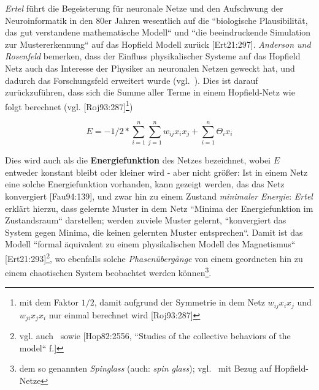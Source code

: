 \textit{Ertel} führt die Begeisterung für neuronale Netze und den Aufschwung der Neuroinformatik in den 80er Jahren wesentlich auf die ``biologische Plausibilität, das gut verstandene mathematische Modell`` und ``die beeindruckende Simulation zur Mustererkennung`` auf das Hopfield Modell zurück [Ert21:297]. \textit{Anderson und Rosenfeld} bemerken, dass der Einfluss physikalischer Systeme auf das Hopfield Netz auch das Interesse der Physiker an neuronalen Netzen geweckt hat, und dadurch das Forschungsfeld erweitert wurde (vgl.~\cite[458]{AR88}). Dies ist darauf zurückzuführen, dass sich die Summe aller Terme in einem Hopfield-Netz wie folgt berechnet (vgl. [Roj93:287]\footnote{
    mit dem Faktor $1/2$, damit aufgrund der Symmetrie in dem Netz $w_{ij}x_ix_j$ und $w_{ji}x_jx_i$ nur einmal berechnet wird [Roj93:287]
})

\begin{equation}
E = -1/2 * \sum^n_{i=1}\sum^n_{j=1} w_{ij}x_ix_j + \sum^n_{i=1}\Theta_ix_i
\label{eq:gl-energie}
\end{equation}

Dies wird auch als die \textbf{Energiefunktion} des Netzes bezeichnet, wobei $E$ entweder konstant bleibt oder kleiner wird - aber nicht größer: Ist in einem Netz eine solche Energiefunktion vorhanden, kann gezeigt werden, das das Netz konvergiert [Fau94:139], und zwar hin zu einem Zustand \textit{minimaler Energie}: \textit{Ertel} erklärt hierzu, dass gelernte Muster in dem Netz ``Minima der Energiefunktion im Zustandsraum`` darstellen; werden zuviele Muster gelernt, ``konvergiert das System gegen Minima, die keinen gelernten Muster entsprechen``.
Damit ist das Modell ``formal äquivalent zu einem physikalischen Modell des Magnetismus`` [Ert21:293]\footnote{
    vgl. auch~\cite[417]{AR98} sowie [Hop82:2556, ``Studies of the collective behaviors of the model`` f.]
}, wo ebenfalls solche \textit{Phasenübergänge} von einem geordneten hin zu einem chaotischen System beobachtet werden können\footnote{
    dem so genannten \textit{Spinglass} (auch: \textit{spin glass}); vgl.~\cite[900]{BY86} mit Bezug auf Hopfield-Netze
}.\\

